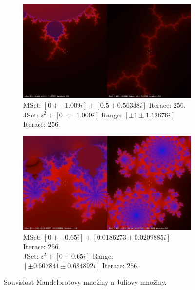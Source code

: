 \documentclass[thesis=B, czech]{FITthesis}[2019/03/06]
\begin{document}

\begin{figure}
\centering
  \begin{subfigure}[b]{1.0\textwidth}
    \includegraphics[width=\textwidth]{images/jmsets2.png}
    \caption[]{\label{fig:js1}MSet: $[0 + -1.009i]\pm[0.5+0.56338i]$ Iterace: $256$.\\JSet: $z^2+[0 + -1.009i]$ Range: $[\pm1 \pm1.12676i]$ Iterace: $256$.}
  \end{subfigure}
  \vspace{5pt}
  \begin{subfigure}[b]{1.0\textwidth}
    \includegraphics[width=\textwidth]{images/jmsets4.png}
    \caption[]{\label{fig:js2}MSet: $[0 + -0.65i]\pm[0.0186273+0.0209885i]$ Iterace: $256$.\\JSet: $z^2+[0 + 0.65i]$ Range: $[\pm0.607841 \pm0.684892i]$ Iterace: $256$.}
  \end{subfigure}
   
    \caption{ \label{fig:js3}Souvislost Mandelbrotovy množiny a Juliovy množiny.}
\end{figure}
\end{document}
